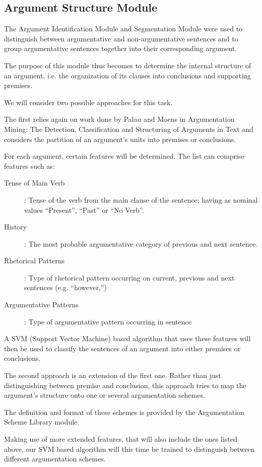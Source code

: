 \documentclass[lnbip]{svmultln}
\begin{document}
\subsection{Argument Structure Module}
\par
The Argument Identification Module and Segmentation Module were used to distinguish between argumentative and non-argumentative sentences and to group argumentative sentences together into their corresponding argument.
\par
The purpose of this module thus becomes to determine the internal structure of an argument, i.e. the organization of its clauses into conclusions and supporting premises. 
\par
We will consider two possible approaches for this task.
\par
The first relies again on work done by Palau and Moens in Argumentation Mining: The Detection, Classification and Structuring of Arguments in Text and considers the partition of an argument’s units into premises or conclusions.
\par
For each argument, certain features will be determined. The list can comprise features such as:
\begin{description}
\item[Tense of Main Verb]: Tense of the verb from the main clause of the sentence; having as nominal values ``Present'', ``Past'' or ``No Verb''.
\item[History]: The most probable argumentative category of previous and next sentence.
\item[Rhetorical Patterns]: Type of rhetorical pattern occurring on current, previous and next sentences (e.g. ``however,'')
\item[Argumentative Patterns]: Type of argumentative pattern occurring in sentence
\end{description}
A SVM (Support Vector Machine) based algorithm that uses these features will then be used to classify the sentences of an argument into either premises or conclusions.
\par
The second approach is an extension of the first one. Rather than just distinguishing between premise and conclusion, this approach tries to map the argument’s structure onto one or several argumentation schemes. 
\par
The definition and format of these schemes is provided by the Argumentation Scheme Library module. 
\par
Making use of more extended features, that will also include the ones listed above, our SVM based algorithm will this time be trained to distinguish between different argumentation schemes. 
\end{document}

